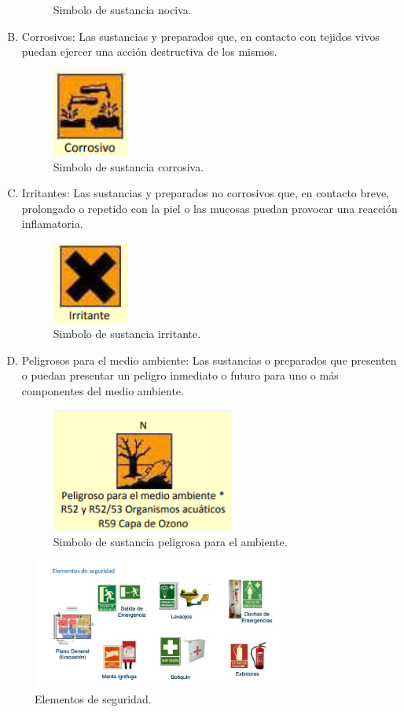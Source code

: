 \documentclass[letterpaper]{IEEEconf}
\begin{document}
\begin{enumerate}[A.]
\begin{figure}[H]
\caption{Simbolo de sustancia nociva.}
\end{figure} 
\item Corrosivos: Las sustancias y preparados que, en contacto con tejidos vivos puedan ejercer una acción destructiva de los mismos.
\begin{figure}[H]
\centering
\includegraphics[width=2.5cm]{corrosivo}
\caption{Simbolo de sustancia corrosiva.}
\end{figure} 
\item Irritantes: Las sustancias y preparados no corrosivos que, en contacto breve, prolongado o repetido con la piel o las mucosas puedan provocar una reacción inflamatoria.
\begin{figure}[H]
\centering
\includegraphics[width=2.5cm]{irritante}
\caption{Simbolo de sustancia irritante.}
\end{figure} 
\item Peligrosos para el medio ambiente: Las sustancias o preparados que presenten o puedan presentar un peligro inmediato o futuro para uno o más componentes del medio ambiente.
\begin{figure}[H]
\centering
\includegraphics[width=6cm]{ambiente}
\caption{Simbolo de sustancia peligrosa para el ambiente.}
\end{figure} 
\end{enumerate}
\begin{figure}[H]
\centering
\includegraphics[width=8.5cm]{seguridad}
\caption{Elementos de seguridad.}
\end{figure} 
\end{document}
